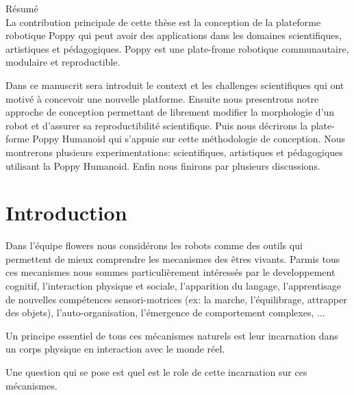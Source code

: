 %

{Résumé}
\label{cha:abstract-diff} \\


La contribution principale de cette thèse est la conception de la plateforme robotique Poppy qui peut avoir des applications dans les domaines scientifiques, artistiques et pédagogiques. Poppy est une plate-frome robotique communautaire, modulaire et reproductible.

Dans ce manuscrit sera introduit le context et les challenges scientifiques qui ont motivé à concevoir une nouvelle platforme. Ensuite nous presentrons notre approche de conception permettant de librement modifier la morphologie d'un robot et d'assurer sa reproductibilité scientifique. Puis nous décrirons la plate-forme Poppy Humanoid qui s'appuie sur cette méthodologie de conception. Nous montrerons plusieurs experimentations: scientifiques, artistiques et pédagogiques utilisant la Poppy Humanoid.
Enfin nous finirons par plusieurs discussions.


\section*{Introduction}


Dans l'équipe flowers nous considérons les robots comme des outils qui permettent de mieux comprendre les mecanismes des êtres vivants. Parmis tous ces mecanismes nous sommes particulièrement intéressés par le developpement cognitif, l'interaction physique et sociale, l'apparition du langage, l'apprentisage de nouvelles compétences sensori-motrices (ex: la marche, l'équilibrage, attrapper des objets), l'auto-organisation, l'émergence de comportement complexes, ...

Un principe essentiel de tous ces mécanismes naturels est leur incarnation dans un corps physique en interaction avec le monde réel.

Une question qui se pose est quel est le role de cette incarnation sur ces mécanismes.

